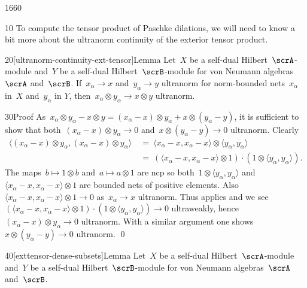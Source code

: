\begin{parsec}{1660}%
\begin{point}{10}%
To compute the tensor product of Paschke dilations,
    we will need to know a bit more about
    the ultranorm continuity of the exterior tensor product.
\end{point}
\begin{point}{20}[ultranorm-continuity-ext-tensor]{Lemma}%
Let~$X$ be a self-dual Hilbert~$\scrA$-module
    and~$Y$ be a self-dual Hilbert~$\scrB$-module
    for von Neumann algebras~$\scrA$ and~$\scrB$.
If~$x_\alpha \to x$ and~$y_\alpha \to y$ ultranorm
    for norm-bounded nets~$x_\alpha$ in~$X$ and~$y_\alpha$ in $Y$,
    then~$x_\alpha \otimes y_\alpha \to x \otimes y$ ultranorm.
\begin{point}{30}{Proof}%
As~$x_\alpha \otimes y_\alpha - x \otimes y
            = (x_\alpha -x )\otimes y_\alpha + x\otimes (y_\alpha - y)$,
            it is sufficient
    to show that both~$(x_\alpha -x) \otimes y_\alpha \to 0$
    and~$x\otimes (y_\alpha - y) \to 0$ ultranorm.
Clearly
\begin{align*}
    \langle (x_\alpha - x) \otimes y_\alpha,
        (x_\alpha - x) \otimes y_\alpha \rangle
    & \ = \ 
    \langle x_\alpha - x , x_\alpha - x \rangle\otimes 
    \langle y_\alpha ,y_\alpha \rangle \\
    & \ = \ 
    (\langle x_\alpha - x , x_\alpha - x \rangle\otimes 1) \cdot (1 \otimes 
    \langle y_\alpha ,y_\alpha \rangle ).
\end{align*}
The maps~$b \mapsto 1 \otimes b$ and~$a \mapsto a \otimes 1$
    are ncp %
    so both~$1 \otimes \langle y_\alpha, y_\alpha \rangle$
    and~$\langle x_\alpha - x , x_\alpha - x \rangle\otimes 1$
    are bounded nets of positive elements.
    Also~$\langle x_\alpha - x , x_\alpha - x \rangle\otimes 1 \to 0$
        as~$x_\alpha \to x$ ultranorm.
Thus \sref{vanishing-effects} applies and we see
    $(\langle x_\alpha - x , x_\alpha - x \rangle\otimes 1) \cdot (1 \otimes 
    \langle y_\alpha ,y_\alpha \rangle ) \to 0$ ultraweakly,
    hence~$(x_\alpha - x) \otimes y_\alpha \to 0$ ultranorm.
With a similar argument
    one shows~$x\otimes (y_\alpha - y) \to 0$ ultranorm. \qed
\end{point}
\end{point}
\begin{point}{40}[exttensor-dense-subsets]{Lemma}%
Let~$X$ be a self-dual Hilbert~$\scrA$-module
    and~$Y$ be a self-dual Hilbert~$\scrB$-module
    for von Neumann algebras~$\scrA$ and~$\scrB$.

\end{point}
\end{parsec}
